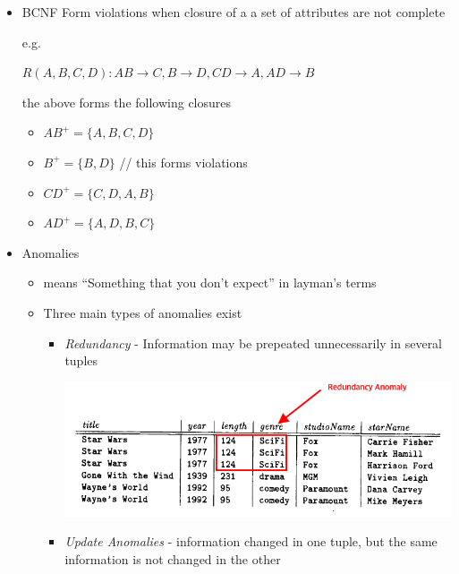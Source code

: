 \documentclass[12pt]{article}
\begin{document}
\begin{enumerate}[1.]
    \bigskip

    \begin{itemize}
        \item BCNF Form violations when closure of a a set of attributes are not complete

        \bigskip

        e.g.


        \bigskip

        $R(A,B,C,D): AB \to C, B \to D, CD \to A, AD \to B$

        \bigskip

        the above forms the following closures


        \begin{itemize}
            \item $AB^+ = \{A, B, C, D\}$
            \item $B^+ = \{B, D\}$ // this forms violations
            \item $CD^+ = \{C, D, A, B\}$
            \item $AD^+ = \{A, D, B, C\}$
        \end{itemize}

        \item Anomalies
        \begin{itemize}
            \item means ``Something that you don't expect'' in layman's terms
            \item Three main types of anomalies exist
            \begin{itemize}
                \item \textit{Redundancy} - Information may be prepeated unnecessarily in several tuples

                \bigskip

                \begin{center}
                \includegraphics[width=0.7\linewidth]{images/worksheet_12_solution_3.png}
                \end{center}

                \item \textit{Update Anomalies} - information changed in one
                tuple, but the same information is not changed in the other


\end{itemize}
\end{itemize}
\end{itemize}
\end{enumerate}
\end{document}
